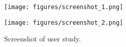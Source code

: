 \begin{figure*}[ht]
\begin{center}
\begin{minipage}{0.48\textwidth}
    \centering
    \texttt{[image: figures/screenshot\_1.png]}
\end{minipage}
\hfill
\begin{minipage}{0.48\textwidth}
    \centering
    \texttt{[image: figures/screenshot\_2.png]}

\end{minipage}
\end{center}
\caption{Screenshot of user study.}
    \label{fig:screenshot}
\end{figure*}
